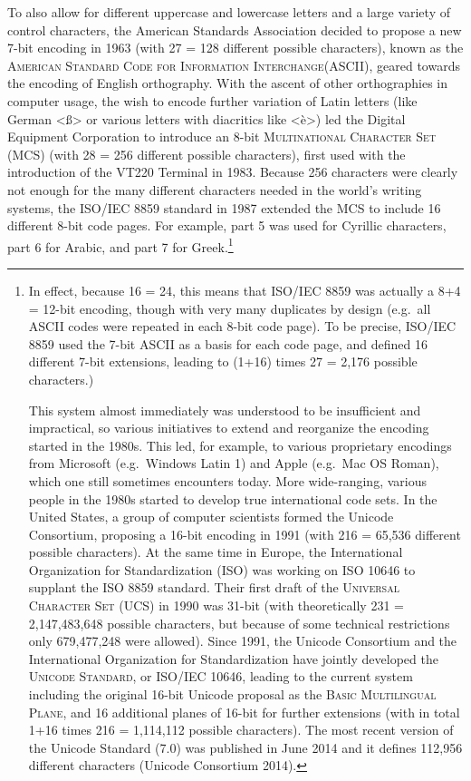{{{{{To also allow for different uppercase and lowercase letters and a large variety of control characters, the American Standards Association decided to propose a new 7-bit encoding in 1963 (with 27 = 128 different possible characters), known as the \textsc{American Standard Code for Information Interchange(ASCII)}, geared towards the encoding of English orthography. With the ascent of other orthographies in computer usage, the wish to encode further variation of Latin letters (like German <ß> or various letters with diacritics like <è>) led the Digital Equipment Corporation to introduce an 8-bit \textsc{Multinational Character Set (MCS)} (with 28 = 256 different possible characters), first used with the introduction of the VT220 Terminal in 1983. Because 256 characters were clearly not enough for the many different characters needed in the world's writing systems, the ISO/IEC 8859 standard in 1987 extended the MCS to include 16 different 8-bit code pages. For example, part 5 was used for Cyrillic characters, part 6 for Arabic, and part 7 for Greek.\footnote{In effect, because 16 = 24, this means that ISO/IEC 8859 was actually a 8+4 = 12-bit encoding, though with very many duplicates by design (e.g.~all ASCII codes were repeated in each 8-bit code page). To be precise, ISO/IEC 8859 used the 7-bit ASCII as a basis for each code page, and defined 16 different 7-bit extensions, leading to (1+16) times 27 = 2,176 possible characters.)

This system almost immediately was understood to be insufficient and impractical, so various initiatives to extend and reorganize the encoding started in the 1980s. This led, for example, to various proprietary encodings from Microsoft (e.g.~Windows Latin 1) and Apple (e.g.~Mac OS Roman), which one still sometimes encounters today. More wide-ranging, various people in the 1980s started to develop true international code sets. In the United States, a group of computer scientists formed the Unicode Consortium, proposing a 16-bit encoding in 1991 (with 216 = 65,536 different possible characters). At the same time in Europe, the International Organization for Standardization (ISO) was working on ISO 10646 to supplant the ISO 8859 standard. Their first draft of the \textsc{Universal Character Set (UCS)} in 1990 was 31-bit (with theoretically 231 = 2,147,483,648 possible characters, but because of some technical restrictions only 679,477,248 were allowed). Since 1991, the Unicode Consortium and the International Organization for Standardization have jointly developed the \textsc{Unicode Standard}, or ISO/IEC 10646, leading to the current system including the original 16-bit Unicode proposal as the \textsc{Basic Multilingual Plane}, and 16 additional planes of 16-bit for further extensions (with in total 1+16 times 216 = 1,114,112 possible characters). The most recent version of the Unicode Standard (7.0) was published in June 2014 and it defines 112,956 different characters (Unicode Consortium 2014).

}}}}}}
